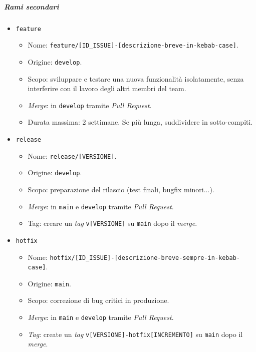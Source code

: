 \documentclass[12pt, a4paper]{article}
\begin{document}
\subparagraph{Rami secondari}
\begin{itemize}
    \item \texttt{feature}
    \begin{itemize}
        \item Nome: \texttt{feature/[ID\_ISSUE]-[descrizione-breve-in-kebab-case]}.
        \item Origine: \texttt{develop}.
        \item Scopo: sviluppare e testare una nuova funzionalità isolatamente, senza interferire con il lavoro degli altri membri del team.
        \item \textit{Merge}: in \texttt{develop} tramite \textit{Pull Request}.
        \item Durata massima: 2 settimane. Se più lunga, suddividere in sotto-compiti.
    \end{itemize}
    \item \texttt{release}
    \begin{itemize}
        \item Nome: \texttt{release/[VERSIONE]}.
        \item Origine: \texttt{develop}.
        \item Scopo: preparazione del rilascio (test finali, bugfix minori...).
        \item \textit{Merge}: in \texttt{main} e \texttt{develop} tramite \textit{Pull Request}.
        \item Tag: creare un \textit{tag} \texttt{v[VERSIONE]} su \texttt{main} dopo il \textit{merge}.
    \end{itemize}
    \item \texttt{hotfix}
    \begin{itemize}
        \item Nome: \texttt{hotfix/[ID\_ISSUE]-[descrizione-breve-sempre-in-kebab-case]}.
        \item Origine: \texttt{main}.
        \item Scopo: correzione di bug critici in produzione.
        \item \textit{Merge}: in \texttt{main} e \texttt{develop} tramite \textit{Pull Request}.
        \item \textit{Tag}: create un \textit{tag} \texttt{v[VERSIONE]-hotfix[INCREMENTO]} su \texttt{main} dopo il \textit{merge}.
    \end{itemize}
\end{itemize}
\end{document}
